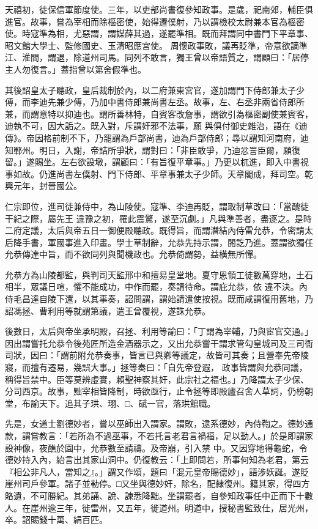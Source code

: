 \begin{pinyinscope}
 天禧初，徙保信軍節度使。三年，以吏部尚書復參知政事。是歲，祀南郊，輔臣俱進官。故事，嘗為宰相而除樞密使，始得遷僕射，乃以謂檢校太尉兼本官為樞密使。時寇準為相，尤惡謂，謂媒薛其過，遂罷準相。既而拜謂同中書門下平章事、昭文館大學士、監修國史、玉清昭應宮使。
 周懷政事敗，議再貶準，帝意欲謫準江、淮間，謂退，除道州司馬。同列不敢言，獨王曾以帝語質之，謂顧曰：「居停主人勿復言。」蓋指曾以第舍假準也。



 其後詔皇太子聽政，皇后裁制於內，以二府兼東宮官，遂加謂門下侍郎兼太子少傅，而李迪先兼少傅，乃加中書侍郎兼尚書左丞。故事，左、右丞非兩省侍郎所兼，而謂意特以抑迪也。謂所善林特，自賓客改詹事，謂欲引為樞密副使兼賓客，迪執不可，因大詬之。既入對，斥謂奸邪不法事，願
 與俱付御史雜治，語在《迪傳》。帝因格前制不下，乃罷謂為戶部尚書，迪為戶部侍郎；尋以謂知河南府，迪知鄆州。明日，入謝，帝詰所爭狀，謂對曰：「非臣敢爭，乃迪忿詈臣爾，願復留。」遂賜坐。左右欲設墩，謂顧曰：「有旨復平章事。」乃更以杌進，即入中書視事如故。仍進尚書左僕射、門下侍郎、平章事兼太子少師。天章閣成，拜司空。乾興元年，封晉國公。



 仁宗即位，進司徒兼侍中，為山陵使。寇準、李迪再貶，謂取制草改曰：「當醜徒干紀之際，屬先王
 違豫之初，罹此震驚，遂至沉劇。」凡與準善者，盡逐之。是時二府定議，太后與帝五日一御便殿聽政。既得旨，而謂潛結內侍雷允恭，令密請太后降手書，軍國事進入印畫。學士草制辭，允恭先持示謂，閱訖乃進。蓋謂欲獨任允恭傳達中旨，而不欲同列與聞機政也。允恭倚謂勢，益橫無所憚。



 允恭方為山陵都監，與判司天監邢中和擅易皇堂地。夏守恩領工徒數萬穿地，土石相半，眾議日喧，懼不能成功，中作而罷，奏請待命。謂庇允恭，依
 違不決。內侍毛昌達自陵下還，以其事奏，詔問謂，謂始請遣使按視。既而咸謂復用舊地，乃詔馮拯、曹利用等就謂第議，遣王曾覆視，遂誅允恭。



 後數日，太后與帝坐承明殿，召拯、利用等諭曰：「丁謂為宰輔，乃與宦官交通。」因出謂嘗托允恭令後苑匠所造金酒器示之，又出允恭嘗干謂求管勾皇城司及三司衙司狀，因曰：「謂前附允恭奏事，皆言已與卿等議定，故皆可其奏；且營奉先帝陵寢，而擅有遷易，幾誤大事。」拯等奏曰：「自先帝登遐，
 政事皆謂與允恭同議，稱得旨禁中。臣等莫辨虛實，賴聖神察其奸，此宗社之福也。」乃降謂太子少保、分司西京。故事，黜宰相皆降制，時欲亟行，止令拯等即殿廬召舍人草詞，仍榜朝堂，布諭天下。追其子珙、珝、□、碔一官，落珙館職。



 先是，女道士劉德妙者，嘗以巫師出入謂家。謂敗，逮系德妙，內侍鞫之。德妙通款，謂嘗教言：「若所為不過巫事，不若托言老君言禍福，足以動人。」於是即謂家設神像，夜醮於園中，允恭數至請禱。及帝崩，引入禁
 中。又因穿地得龜蛇，令德妙持入內，紿言出其家山洞中。仍復教云：「上即問若，所事何知為老君，第云『相公非凡人，當知之』。」謂又作頌，題曰「混元皇帝賜德妙」，語涉妖誕。遂貶崖州司戶參軍。諸子並勒停。□又坐與德妙奸，除名，配隸復州。籍其家，得四方賂遺，不可勝紀。其弟誦、說、諫悉降黜。坐謂罷者，自參知政事任中正而下十數人。在崖州逾三年，徙雷州，又五年，徙道州。明道中，授秘書監致仕，居光州，卒。詔賜錢十萬、絹百匹。




\end{pinyinscope}
